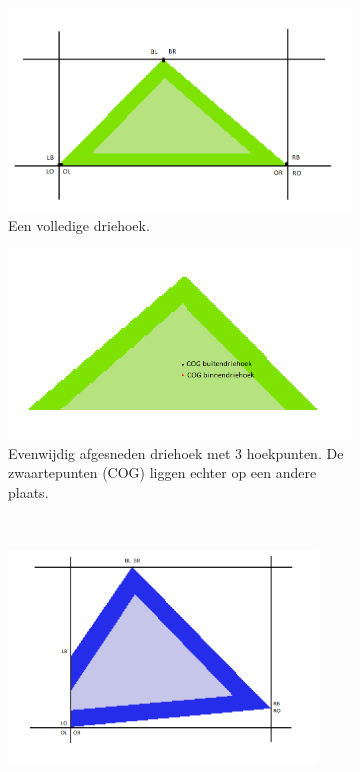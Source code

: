 \begin{figure}[h]
	\begin{subfigure}{0.33\textwidth}
	\centering
	\includegraphics[width=1\textwidth]{GoedeDriehoek.png}
	\caption{Een volledige driehoek.}
	\label{fig:GoedeDriehoek}
	\end{subfigure}
	\begin{subfigure}{0.33\textwidth}
	\centering
	\includegraphics[width=1\textwidth]{GoedAfgesnedenDriehoek.png}
	\caption{Evenwijdig afgesneden driehoek met 3 hoekpunten. De zwaartepunten (COG) liggen echter op een andere plaats.}
	\label{fig:GoedAfgesnedenDriehoek}
	\end{subfigure}
	\
	\begin{subfigure}{0.33\textwidth}
		\centering
		\includegraphics[width=0.9\textwidth]{SlechtAfgesnedenDriehoek.png}

\end{subfigure}
\end{figure}
